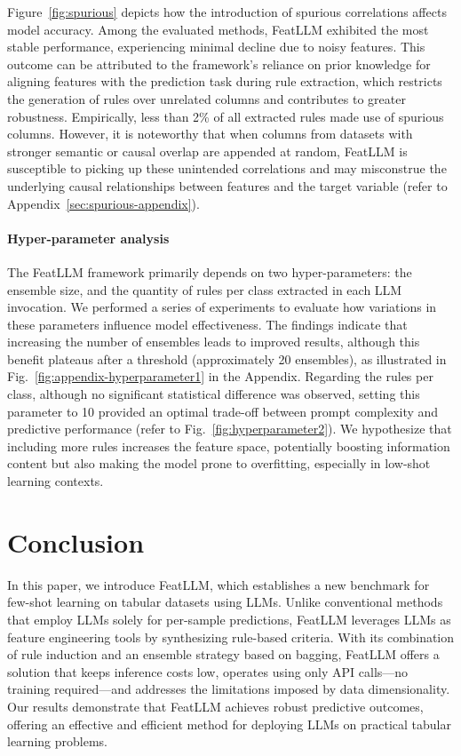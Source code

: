 Figure~\ref{fig:spurious} depicts how the introduction of spurious correlations affects model accuracy. Among the evaluated methods, \textsf{FeatLLM} exhibited the most stable performance, experiencing minimal decline due to noisy features. This outcome can be attributed to the framework’s reliance on prior knowledge for aligning features with the prediction task during rule extraction, which restricts the generation of rules over unrelated columns and contributes to greater robustness. Empirically, less than 2\% of all extracted rules made use of spurious columns. However, it is noteworthy that when columns from datasets with stronger semantic or causal overlap are appended at random, \textsf{FeatLLM} is susceptible to picking up these unintended correlations and may misconstrue the underlying causal relationships between features and the target variable (refer to Appendix~\ref{sec:spurious-appendix}).

\vspace*{-0.12in}
\paragraph{Hyper-parameter analysis}
The \textsf{FeatLLM} framework primarily depends on two hyper-parameters: the ensemble size, and the quantity of rules per class extracted in each LLM invocation. We performed a series of experiments to evaluate how variations in these parameters influence model effectiveness. The findings indicate that increasing the number of ensembles leads to improved results, although this benefit plateaus after a threshold (approximately 20 ensembles), as illustrated in Fig.~\ref{fig:appendix-hyperparameter1} in the Appendix. Regarding the rules per class, although no significant statistical difference was observed, setting this parameter to 10 provided an optimal trade-off between prompt complexity and predictive performance (refer to Fig.~\ref{fig:hyperparameter2}). We hypothesize that including more rules increases the feature space, potentially boosting information content but also making the model prone to overfitting, especially in low-shot learning contexts.

\section{Conclusion}
In this paper, we introduce \textsf{FeatLLM}, which establishes a new benchmark for few-shot learning on tabular datasets using LLMs. Unlike conventional methods that employ LLMs solely for per-sample predictions, \textsf{FeatLLM} leverages LLMs as feature engineering tools by synthesizing rule-based criteria. With its combination of rule induction and an ensemble strategy based on bagging, \textsf{FeatLLM} offers a solution that keeps inference costs low, operates using only API calls—no training required—and addresses the limitations imposed by data dimensionality. Our results demonstrate that \textsf{FeatLLM} achieves robust predictive outcomes, offering an effective and efficient method for deploying LLMs on practical tabular learning problems.

